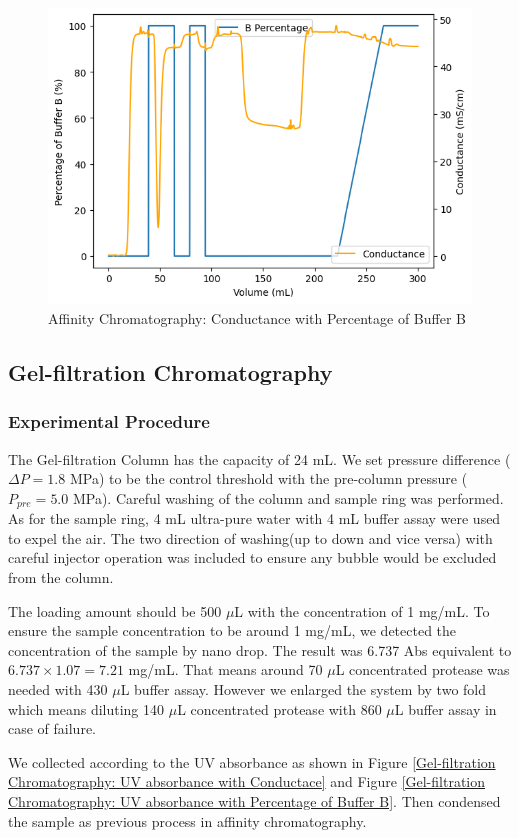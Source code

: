 \documentclass{report}
\begin{document}
\begin{figure}
    \centering
    \includegraphics[width=0.6\linewidth]{../Figures/Affinity Column Conductance.png}
    \caption{Affinity Chromatography: Conductance with Percentage of Buffer B}
    \label{Affinity Chromatography: Conductance}
\end{figure}


\subsection{Gel-filtration Chromatography}
\subsubsection{Experimental Procedure}
The Gel-filtration Column has the capacity of 24 mL.
We set pressure difference ($\Delta P=1.8$ MPa) to be the control threshold with the pre-column pressure ($P_{pre}=5.0$ MPa).
Careful washing of the column and sample ring was performed.
As for the sample ring, 4 mL ultra-pure water with 4 mL buffer assay were used to expel the air.
The two direction of washing(up to down and vice versa) with careful injector operation was included to ensure any bubble would be excluded from the column.

The loading amount should be 500 $\mu$L with the concentration of 1 mg/mL.
To ensure the sample concentration to be around 1 mg/mL, we detected the concentration of the sample by nano drop.
The result was 6.737 Abs equivalent to $6.737\times1.07=7.21$ mg/mL.
That means around 70 $\mu$L concentrated protease was needed with 430 $\mu$L buffer assay.
However we enlarged the system by two fold which means diluting 140 $\mu$L concentrated protease with 860 $\mu$L buffer assay in case of failure.



We collected according to the UV absorbance as shown in Figure \ref{Gel-filtration Chromatography: UV absorbance with Conductace} and Figure \ref{Gel-filtration Chromatography: UV absorbance with Percentage of Buffer B}.
Then condensed the sample as previous process in affinity chromatography.
\end{document}
